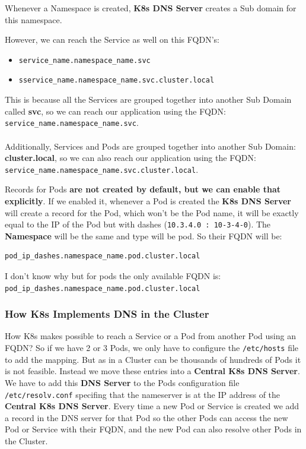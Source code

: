 \documentclass{article}
\newenvironment{blocktemplate}[1]{%
    \tcolorbox[beamer,%
    noparskip,breakable,
    colframe=Blue,%
    colbacklower=LimeGreen!75!LightGreen,%
    title=#1]}%
    {\endtcolorbox}
\newenvironment{blocktemplateIII}[1]{%
    \tcolorbox[beamer,%
    noparskip,breakable,
    ,colframe=Red,%
    colbacklower=LimeGreen!75!LightGreen,%
    title=#1]}%
    {\endtcolorbox}
\newenvironment{codetemplate}[1][]{%
  \mybasecolorbox[#1]
  \itshape
}{%
  \endmybasecolorbox
}
\begin{document}
Whenever a Namespace is created, \textbf{K8s DNS Server} creates a Sub domain for this namespace. 


\begin{blocktemplate}{NOTE}
However, we can reach the Service as well on this FQDN's:
\begin{itemize}
    \item \verb|service_name.namespace_name.svc|
    \item \verb|sservice_name.namespace_name.svc.cluster.local|
\end{itemize}

This is because all the Services are grouped together into another Sub Domain called \textbf{svc}, 
so we can reach our application using the FQDN: \verb|service_name.namespace_name.svc|. 
\\\\
Additionally, Services and Pods are grouped together into another Sub Domain: \textbf{cluster.local}, 
so we can also reach our application using the FQDN:
\verb|service_name.namespace_name.svc.cluster.local|.
\end{blocktemplate}

Records for Pods \textbf{are not created by default, but we can enable that explicitly}. 
If we enabled it, whenever a Pod is created the \textbf{K8s DNS Server} will create 
a record for the Pod, which won't be the Pod name, it will be exactly equal to the IP 
of the Pod but with dashes (\verb|10.3.4.0 : 10-3-4-0|). 
The \textbf{Namespace} will be the same and type will be pod. So their FQDN will be: 
\begin{codetemplate}{}
\begin{verbatim}
pod_ip_dashes.namespace_name.pod.cluster.local
\end{verbatim}
\end{codetemplate}

\begin{blocktemplateIII}{WARNING}
I don't know why but for pods the only available FQDN is: \verb|pod_ip_dashes.namespace_name.pod.cluster.local|
\end{blocktemplateIII}

\subsubsection{How K8s Implements DNS in the Cluster}
How K8s makes possible to reach a Service or a Pod from another Pod using an FQDN? So if we have 2 or 3 Pods, we only have to configure the \verb|/etc/hosts| file to add the mapping. But as in a Cluster can be thousands of hundreds of Pods it is not feasible. Instead we move these entries into a \textbf{Central K8s DNS Server}. We have to add this \textbf{DNS Server} to the Pods configuration file \verb|/etc/resolv.conf| specifing that the nameserver is at the IP address of the \textbf{Central K8s DNS Server}. Every time a new Pod or Service is created we add a record in the DNS server for that Pod so the other Pods can access the new Pod or Service with their FQDN, and the new Pod can also resolve other Pods in the Cluster.
\end{document}
